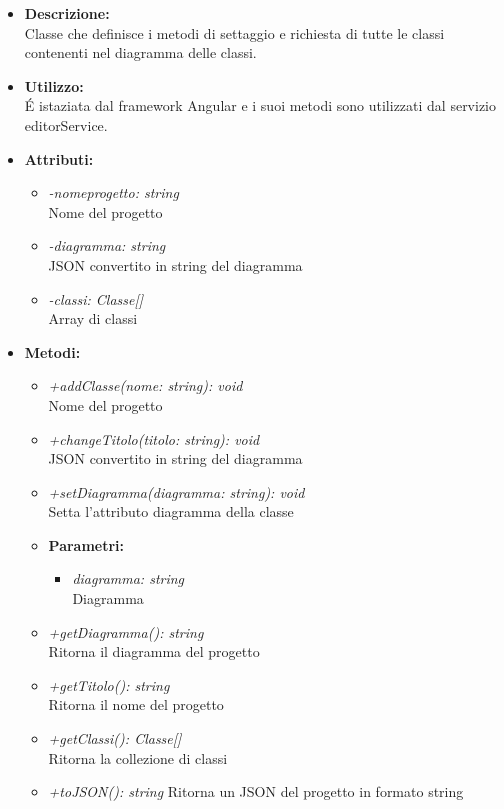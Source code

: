 				\begin{itemize}
          			\item \textbf{Descrizione:}\\
          			Classe che definisce i metodi di settaggio e richiesta di tutte le classi contenenti nel diagramma delle classi.
          			\item \textbf{Utilizzo:}\\
          			É istaziata dal framework Angular e i suoi metodi sono utilizzati dal servizio editorService.
          			\item \textbf{Attributi:}\\
          			\begin{itemize}
          				\item \emph{-nomeprogetto: string}\\
          				Nome del progetto
          				\item \emph{-diagramma: string}\\
          				JSON convertito in string del diagramma
          				\item \emph{-classi: Classe[]}\\
          				Array di classi
          			\end{itemize}
          			\item \textbf{Metodi:}\\
          			\begin{itemize}
          				\item \emph{+addClasse(nome: string): void}\\
          				Nome del progetto
          				\item \emph{+changeTitolo(titolo: string): void}\\
          				JSON convertito in string del diagramma
          				\item \emph{+setDiagramma(diagramma: string): void}\\
          				Setta l'attributo diagramma della classe
          				\item \textbf{Parametri:}\\
            				\begin{itemize}
            					\item \emph{diagramma: string}\\
            					Diagramma
            				\end{itemize}
          				\item \emph{+getDiagramma(): string}\\
          				Ritorna il diagramma del progetto
          				\item \emph{+getTitolo(): string}\\
          				Ritorna il nome del progetto
          				\item \emph{+getClassi(): Classe[]}\\
          				Ritorna la collezione di classi
          				\item \emph{+toJSON(): string}
          				Ritorna un JSON del progetto in formato string
          			\end{itemize}
          		\end{itemize}